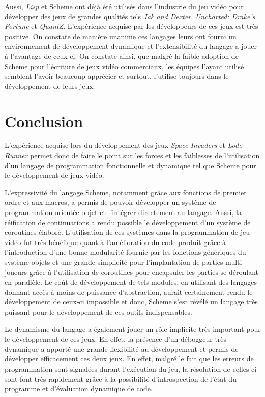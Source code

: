 \documentclass[12pt,oneside,letterpaper,francais]{book}
\newcommand{\lr}{{\textit{Lode Runner }}}
\newcommand{\si}{{\textit{Space Invaders }}}
\newcommand{\lisp}{{\textit{Lisp }}}
\begin{document}
Aussi, \lisp et Scheme ont déjà été utilisés dans l'industrie du jeu
vidéo pour développer des jeux de grandes qualités tels \textit{Jak
  and Dexter}, \textit{Uncharted: Drake's Fortune} et
\textit{QuantZ}. L'expérience acquise par les développeurs de ces jeux
est très positive. On constate de manière unanime ces langages leurs
ont fourni un environnement de développement dynamique et
l'extensibilité du langage a jouer à l'avantage de ceux-ci. On
constate ainsi, que malgré la faible adoption de Scheme pour
l'écriture de jeux vidéo commerciaux, les équipes l'ayant utilisé
semblent l'avoir beaucoup apprécier et surtout, l'utilise toujours
dans le développement de leurs jeux.



\chapter{Conclusion}


L'expérience acquise lors du développement des jeux \si et \lr permet
donc de faire le point sur les forces et les faiblesses de
l'utilisation d'un langage de programmation fonctionnelle et dynamique
tel que Scheme pour le développement de jeux vidéo.

L'expressivité du langage Scheme, notamment grâce aux fonctions de
premier ordre et aux macros, a permis de pouvoir développer un système
de programmation orientée objet et l'intégrer directement au
langage. Aussi, la réification de continuations a rendu possible le
développement d'un système de coroutines élaboré.  L'utilisation de
ces systèmes dans la programmation de jeu vidéo fut très bénéfique
quant à l'amélioration du code produit grâce à l'introduction d'une
bonne modularité fournie par les fonctions génériques du système
objets et une grande simplicité pour l'implantation de parties
multi-joueurs grâce à l'utilisation de coroutines pour encapsuler les
parties se déroulant en parallèle. Le coût de développement de tels
modules, en utilisant des langages donnant accès à moins de puissance
d'abstraction, aurait certainement rendu le développement de ceux-ci
impossible et donc, Scheme s'est révélé un langage très puissant pour
le développement de ces outils indispensables.

Le dynamisme du langage a également jouer un rôle implicite très
important pour le développement de ces jeux. En effet, la présence
d'un déboggeur très dynamique a apporté une grande flexibilité au
développement et permis de développer efficacement ces deux jeux. En
effet, malgré le fait que les erreurs de programmation sont signalées
durant l'exécution du jeu, la résolution de celles-ci sont font très
rapidement grâce à la possibilité d'introspection de l'état du
programme et d'évaluation dynamique de code.
\end{document}
